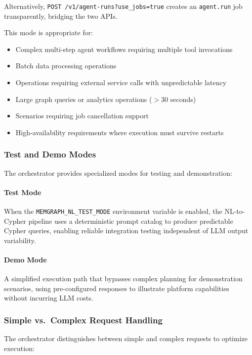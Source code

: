 \documentclass[a4paper,twoside]{sapthesis}
\begin{document}
Alternatively, \texttt{POST /v1/agent-runs?use\_jobs=true} creates an \texttt{agent.run} job transparently, bridging the two APIs.

This mode is appropriate for:
\begin{itemize}
    \item Complex multi-step agent workflows requiring multiple tool invocations
    \item Batch data processing operations
    \item Operations requiring external service calls with unpredictable latency
    \item Large graph queries or analytics operations ($>$30 seconds)
    \item Scenarios requiring job cancellation support
    \item High-availability requirements where execution must survive restarts
\end{itemize}

\subsubsection{Test and Demo Modes}

The orchestrator provides specialized modes for testing and demonstration:

\paragraph{Test Mode} When the \texttt{MEMGRAPH\_NL\_TEST\_MODE} environment variable is enabled, the NL-to-Cypher pipeline uses a deterministic prompt catalog to produce predictable Cypher queries, enabling reliable integration testing independent of LLM output variability.

\paragraph{Demo Mode} A simplified execution path that bypasses complex planning for demonstration scenarios, using pre-configured responses to illustrate platform capabilities without incurring LLM costs.

\subsubsection{Simple vs.\ Complex Request Handling}

The orchestrator distinguishes between simple and complex requests to optimize execution:
\end{document}
